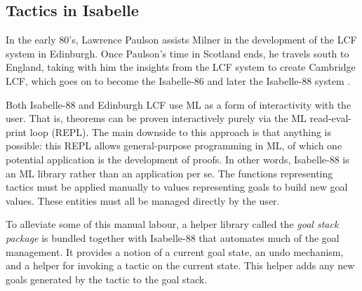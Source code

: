 \subsection{Tactics in Isabelle}

\newcommand{\isb}{Isabelle-88}

In the early 80's, Lawrence Paulson assists Milner in the development of the
LCF system in Edinburgh. Once Paulson's time in Scotland ends, he travels
south to England, taking with him the insights from the LCF system to create
Cambridge LCF, which goes on to become the Isabelle-86 and later the \isb{}
system \cite{isabelle-origin}.

Both \isb{} and Edinburgh LCF use ML as a form of interactivity with the
user.
That is, theorems can be proven interactively purely via the ML
read-eval-print loop (REPL).
The main downside to this approach is that anything is possible:
this REPL allows general-purpose programming in ML, of which one potential
application is the development of proofs.
In other words, \isb{} is an ML library rather than an application per se.
The functions representing tactics must be applied manually to
values representing goals to build new goal values.
These entities must all be managed directly by the user.

To alleviate some of this manual labour, a helper library called the
\emph{goal stack package} is bundled together with \isb{} that automates much of
the goal management.
It provides a notion of a current goal state, an undo mechanism, and a helper
for invoking a tactic on the current state.
This helper adds any new goals generated by the tactic to the goal stack.

